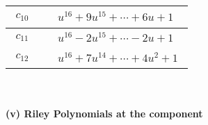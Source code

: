 \documentclass[1p]{elsarticle_modified}
\theoremstyle{definition}
\begin{document}
\begin{tabular}{m{50pt}|m{274pt}}
\hline $$\begin{aligned}c_{10}\end{aligned}$$&$\begin{aligned}
&u^{16}+9 u^{15}+\cdots+6 u+1
\end{aligned}$\\
\hline $$\begin{aligned}c_{11}\end{aligned}$$&$\begin{aligned}
&u^{16}-2 u^{15}+\cdots-2 u+1
\end{aligned}$\\
\hline $$\begin{aligned}c_{12}\end{aligned}$$&$\begin{aligned}
&u^{16}+7 u^{14}+\cdots+4 u^2+1
\end{aligned}$\\
\hline
\end{tabular}\\~\\
\newpage\renewcommand{\arraystretch}{1}
\flushleft \textbf{(v) Riley Polynomials at the component}\newline \\
\end{document}
